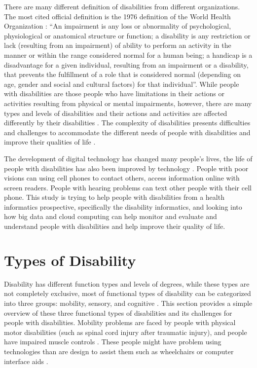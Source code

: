 \documentclass[sigconf]{acmart}
\begin{document}
There are many different definition of disabilities from different organizations. The most cited official
definition is the 1976 definition of the World Health Organization \cite{Appleyard2005}: ``An impairment is
any loss or abnormality of psychological, physiological or anatomical structure or function; a disability
is any restriction or lack (resulting from an impairment) of ability to perform an activity in the manner
or within the range considered normal for a human being; a handicap is a disadvantage for a given
individual, resulting from an impairment or a disability, that prevents the fulfillment of a role that is
considered normal (depending on age, gender and social and cultural factors) for that individual''. While
people with disabilities are those people who have limitations in their actions or activities resulting
from physical or mental impairments, however, there are many types and levels of disabilities and their
actions and activities are affected differently by their disabilities \cite{Appleyard2005}. The complexity
of disabilities presents difficulties and challenges to accommodate the different needs of people with
disabilities and improve their qualities of life \cite{Datapop}. 


The development of digital technology has changed many people's lives, the life of people with disabilities
has also been improved by technology \cite{Datapop}. People with poor visions can using cell phones to
contact others, access information online with screen readers. People with hearing problems can text other
people with their cell phone. This study is trying to help people with disabilities from a health
informatics prospective, specifically the disability informatics, and looking into how big data and cloud
computing can help monitor and evaluate and understand people with disabilities and help improve their
quality of life. 


\section{Types of Disability}
Disability has different function types and levels of degrees, while these types are not completely exclusive, 
most of functional types of disability can be categorized into three groups: mobility, sensory, and cognitive
\cite{Appleyard2005}. This section provides a simple overview of these three functional types of disabilities 
and its challenges for people with disabilities. Mobility problems are faced by people with physical motor 
disabilities (such as spinal cord injury after traumatic injury), and people have impaired muscle controls 
\cite{SMITH1987376}. These people might have problem using technologies than are design to assist them such 
as wheelchairs or computer interface aids \cite{Appleyard2005}.
\end{document}
